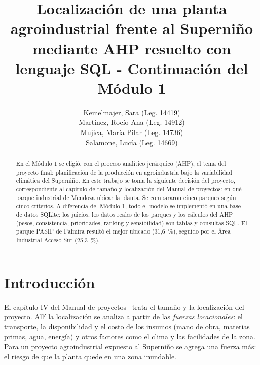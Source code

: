\documentclass[runningheads]{llncs}
\begin{document}
\title{Localización de una planta agroindustrial frente al Superniño mediante AHP resuelto con lenguaje SQL - Continuación del Módulo 1}

\author{Kemelmajer, Sara (Leg. 14419) \\
Martinez, Rocío Ana (Leg. 14912) \\
Mujica, María Pilar (Leg. 14736) \\
Salamone, Lucía (Leg. 14669) }


\maketitle

\begin{abstract}
En el Módulo 1 se eligió, con el proceso analítico jerárquico (AHP), el tema del proyecto final: planificación de la producción en agroindustria bajo la variabilidad climática del Superniño. En este trabajo se toma la siguiente decisión del proyecto, correspondiente al capítulo de tamaño y localización del Manual de proyectos: en qué parque industrial de Mendoza ubicar la planta. Se compararon cinco parques según cinco criterios. A diferencia del Módulo 1, todo el modelo se implementó en una base de datos SQLite: los juicios, los datos reales de los parques y los cálculos del AHP (pesos, consistencia, prioridades, ranking y sensibilidad) son tablas y consultas SQL. El parque PASIP de Palmira resultó el mejor ubicado (31,6~\%), seguido por el Área Industrial Acceso Sur (25,3~\%).
\end{abstract}

\section{Introducción}
El capítulo IV del Manual de proyectos~\cite{melnick} trata el tamaño y la localización del proyecto. Allí la localización se analiza a partir de las \emph{fuerzas locacionales}: el transporte, la disponibilidad y el costo de los insumos (mano de obra, materias primas, agua, energía) y otros factores como el clima y las facilidades de la zona. Para un proyecto agroindustrial expuesto al Superniño se agrega una fuerza más: el riesgo de que la planta quede en una zona inundable.
\end{document}
